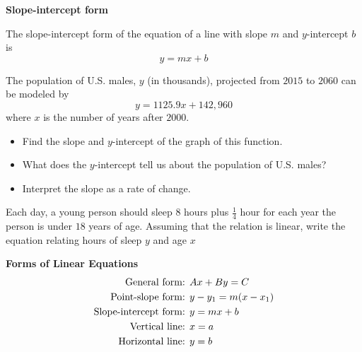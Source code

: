 \documentclass[../mathNotesPreamble]{subfiles}
\begin{document}
    \noindent\textbf{Slope-intercept form}
    \begin{defn*}
      The slope-intercept form of the equation of a line with slope $m$ and $y$-intercept $b$ is
        \[y=mx+b\]
    \end{defn*}
    \begin{ex*}[Example 7, p.82]
      The population of U.S. males, $y$ (in thousands), projected from $2015$ to $2060$ can be modeled by
        \[y=1125.9x+142,960\]
      where $x$ is the number of years after $2000$.
      \begin{itemize}
        \item Find the slope and $y$-intercept of the graph of this function.
        \item What does the $y$-intercept tell us about the population of U.S. males?
        \item Interpret the slope as a rate of change.
      \end{itemize}
    \end{ex*}
    \pagebreak

    \begin{ex*}
      Each day, a young person should sleep 8 hours plus $\frac{1}{4}$ hour for each year the person is under $18$ years of age. Assuming that the relation is linear, write the equation relating hours of sleep $y$ and age $x$
    \end{ex*}

    \textbf{Forms of Linear Equations}\\
      \begin{align*}
        \textnormal{General form: }& Ax+By=C\\
        \textnormal{Point-slope form: }& y-y_1=m(x-x_1)\\
        \textnormal{Slope-intercept form: }& y=mx+b\\
        \textnormal{Vertical line: }& x=a\\
        \textnormal{Horizontal line: }& y=b
      \end{align*}

    \pagebreak
\end{document}
